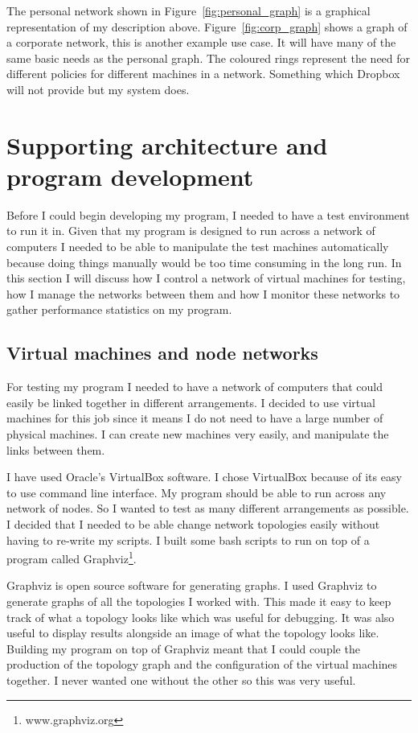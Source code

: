 \documentclass[12pt]{article}
\begin{document}
The personal network shown in
Figure~\ref{fig:personal_graph} is a graphical representation
of my description above. Figure~\ref{fig:corp_graph}
shows a graph of a corporate network, this
is another example use case. It will have many of the same
basic needs as the personal graph. The coloured rings represent
the need for different policies for different machines in a network.
Something which Dropbox will not provide but my system does.


\newpage
\section{Supporting architecture and program development}
Before I could begin developing my program, I needed to
have a test environment to run it in. Given that my program
is designed to run across a network of computers I needed
to be able to manipulate the test machines automatically
because doing things manually would be too time consuming
in the long run. In this section I will discuss how I
control a network of virtual machines for testing, how
I manage the networks between them and how I monitor
these networks to gather performance statistics on
my program.

\subsection{Virtual machines and node networks}
\label{sec:vm_network}
For testing my program I needed to have a network
of computers that could easily be linked together in different
arrangements. I decided to use virtual machines for
this job since it means I do not need to have a large number
of physical machines. I can create new machines very easily,
and manipulate the links between them.

I have used Oracle's VirtualBox software. I chose
VirtualBox because of its easy to use command
line interface.
My program should be able to run across
any network of nodes. So I wanted to test
as many different arrangements as possible.
I decided that I needed to be able change network
topologies easily without having to re-write
my scripts. I built some bash scripts to run on top
of a program called Graphviz\footnote{www.graphviz.org}.

Graphviz is open source software for generating graphs.
I used Graphviz to generate graphs of all the topologies I worked
with. This made it easy to keep track of what a topology looks like
which was useful for debugging. It was also useful to display results
alongside an image of what the topology looks like. Building my
program on top of Graphviz meant that I could couple the production
of the topology graph and the configuration of the virtual machines
together. I never wanted one without the other so this was very useful.
\end{document}
